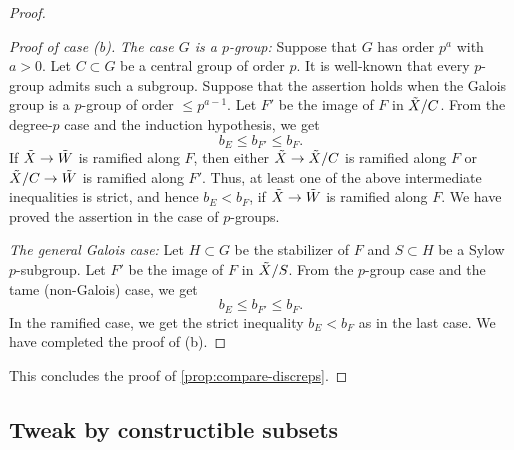 \documentclass[12pt]{amsart}
\theoremstyle{plain}   %
\theoremstyle{definition}    %
\theoremstyle{remark}    %
\numberwithin{equation}{theorem}
\begin{document}
\begin{proof}
\begin{proof}[Proof of case (b)]
 \emph{The case $G$ is a $p$-group:} Suppose that $G$ has order $p^{a}$ with $a>0$. Let $C\subset G $ be a central group of order $p$. It is well-known that every $p$-group admits such a subgroup. Suppose that the assertion holds when the Galois group is a $p$-group of order $\le p^{a-1}$. Let $F'$ be the image of $F$ in $\Tilde{X}/C$. From the degree-$p$ case and the induction hypothesis, we get 
 \[
 b_E \le b_{F'} \le b_F.
 \]
 If $\Tilde{X}\to \Tilde{W}$ is ramified along $F$, then either $\Tilde{X}\to \Tilde{X}/C$ is ramified along $F$ or $\Tilde{X}/C\to \Tilde{W}$ is ramified along $F'$. Thus, at least one of the above intermediate inequalities is strict, and hence $b_E<b_F$, if $\Tilde{X}\to \Tilde{W}$ is ramified along $F$. We have proved the assertion in the case of $p$-groups.
 
 \emph{The general Galois case:} Let $H \subset G$ be the stabilizer of $F$ and $S\subset H$ be a Sylow $p$-subgroup. Let $F'$ be the image of $F$ in $\Tilde{X}/S$. From the $p$-group case and the tame (non-Galois) case, we get 
 \[
 b_E \le b_{F'} \le b_F.
 \]
In the ramified case, we get the strict inequality $b_E<b_F$ as in the last case. We have completed the proof of (b).
\end{proof}
This concludes the proof of \autoref{prop:compare-discreps}.
\end{proof}

\subsection{Tweak by constructible subsets}
\end{document}
